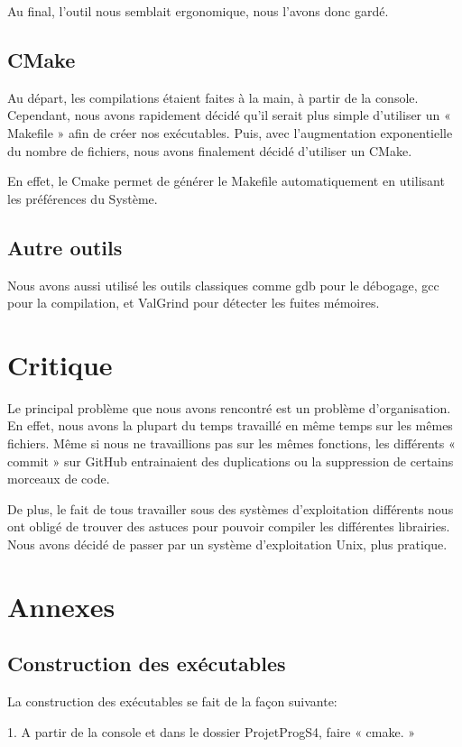\documentclass[12pt]{report}
\begin{document}
Au final, l’outil nous semblait ergonomique, nous l’avons donc gardé.

\section{CMake}
Au départ, les compilations étaient faites à la main, à partir de la console. Cependant, nous avons rapidement décidé qu’il serait plus simple d’utiliser un « Makefile » afin de créer nos exécutables. Puis, avec l’augmentation exponentielle du nombre de fichiers, nous avons finalement décidé d’utiliser un CMake.

En effet, le Cmake permet de générer le Makefile automatiquement en utilisant les préférences du Système.

\section{Autre outils}

Nous avons aussi utilisé les outils classiques comme gdb pour le débogage, gcc pour la compilation, et ValGrind pour détecter les fuites mémoires. 

\chapter{Critique}
Le principal problème que nous avons rencontré est un problème d’organisation. En effet, nous avons la plupart du temps travaillé en même temps sur les mêmes fichiers. Même si nous ne travaillions pas sur les mêmes fonctions, les différents « commit » sur GitHub entrainaient des duplications ou la suppression de certains morceaux de code. 

De plus, le fait de tous travailler sous des systèmes d’exploitation différents nous ont obligé de trouver des astuces pour pouvoir compiler les différentes librairies. Nous avons décidé de passer par un système d’exploitation Unix, plus pratique.


\chapter{Annexes}
\section{Construction des exécutables}
La construction des exécutables se fait de la façon suivante:

1. A partir de la console et dans le dossier ProjetProgS4, faire « cmake. »
\end{document}

